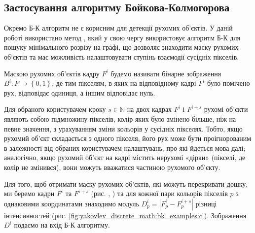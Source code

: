 \subsection{Застосування алгоритму Бойкова-Колмогорова}

Окремо Б-К алгоритм не є корисним для детекції рухомих об'єктів. У даній роботі
використано метод \cite{bib:pavliuk_krygin}, який у свою чергу використовує алгоритм Б-К
для пошуку мінімального розрізу на графі, що дозволяє знаходити
маску рухомих об'єктів та має можливість налаштовувати ступінь взаємодії сусідніх
пікселів.
\begin{definition}
	Маскою рухомих об'єктів кадру \(F^{i}\) будемо називати бінарне
	зображення \(B^{i}:P \rightarrow \left\{ 0,1 \right\}\), де тим
	пікселям, в яких на відповідному кадрі \(F^{i}\) було помічено рух,
	відповідає одиниця, а іншим відповідає нуль.
\end{definition}

Для обраного користувачем
кроку $s \in \mathbb{N}$ на двох кадрах \(F^{i}\) і \(F^{i + s}\) рухомі об'єкти
являють собою підмножину пікселів, колір яких було змінено більше, ніж
на певне значення, з урахуванням зміни кольорів у сусідніх пікселях.
Тобто, якщо рухомий об'єкт складається з одного пікселя, його рух може
бути проігнорованим в залежності від обраних користувачем налаштувань,
про які йдеться мова далі; аналогічно, якщо рухомий об'єкт на кадрі
містить нерухомі «дірки» (пікселі, де колір не змінився), вони можуть
вважатися частиною рухомого об'єкту.


Для того, щоб отримати маску рухомих об'єктів, які можуть перекривати дошку, ми
беремо кадри \(F^{i}\) та \(F^{i + s}\) (рис.
,
) та для
кожної пари кольорів пікселів \(p\) з однаковими координатами знаходимо
модуль \(D_{p}^{i} = \left| F_{p}^{i} - F_{p}^{i + s} \right|\) різниці
інтенсивностей (рис. \ref{fig:yakovlev_discrete_math:bk_examples:c}). Зображення \(D^{i}\) подаємо на вхід
Б-К алгоритму.

